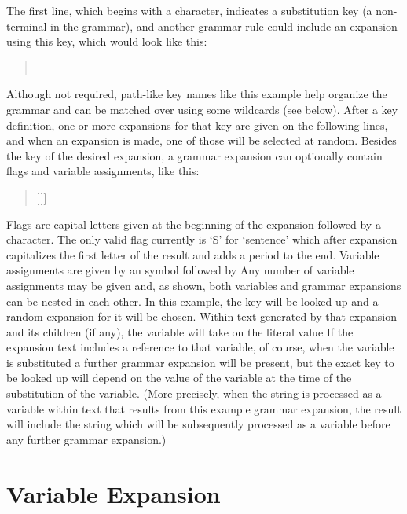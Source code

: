 The first line, which begins with a \exchar{:} character, indicates a substitution key (a non-terminal in the grammar), and another grammar rule could include an expansion using this key, which would look like this:

\begin{quote}
  \ttfamily
  [[action/attack/option]]
\end{quote}

Although not required, path-like key names like this example help organize the grammar and can be matched over using some wildcards (see below).
%
After a key definition, one or more expansions for that key are given on the following lines, and when an expansion is made, one of those will be selected at random.
%
Besides the key of the desired expansion, a grammar expansion can optionally contain flags and variable assignments, like this:

\begin{quote}
  \ttfamily
  [[S|misc/you\_ask\_for@statement=[[action/?\_action/option]]]]
\end{quote}

Flags are capital letters given at the beginning of the expansion followed by a \exchar{|} character.
%
The only valid flag currently is `S' for `sentence' which after expansion capitalizes the first letter of the result and adds a period to the end.
%
Variable assignments are given by an  symbol followed by 
%
Any number of variable assignments may be given and, as shown, both variables
and grammar expansions can be nested in each other.
%
In this example, the key  will be looked up and a random expansion for it will be chosen.
%
Within text generated by that expansion and its children (if any), the variable  will take on the literal value 
%
If the expansion text includes a reference to that variable, of course, when the variable is substituted a further grammar expansion will be present, but the exact key to be looked up will depend on the value of the variable  at the time of the substitution of the  variable.
%
(More precisely, when the string  is processed as a variable within text that results from this example grammar expansion, the result will include the string  which will be subsequently processed as a variable before any further grammar expansion.)


\section{Variable Expansion}

